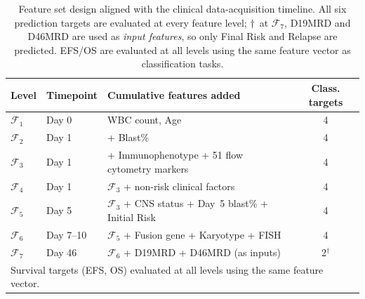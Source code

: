 \documentclass[pdflatex,sn-nature]{sn-jnl}
\begin{document}
\begin{table}[ht]
\caption{Feature set design aligned with the clinical data-acquisition
timeline. All six prediction targets are evaluated at every feature
level; $\dagger$~at $\mathcal{F}_7$, D19MRD and
D46MRD are used as \emph{input features}, so only Final Risk and
Relapse are predicted. EFS/OS are evaluated at all levels using
the same feature vector as classification tasks.}
\label{tab:expdesign}
\centering
\small
\begin{tabular}{lllc}
\toprule
\textbf{Level} & \textbf{Timepoint} & \textbf{Cumulative features added} & \textbf{Class. targets} \\
\midrule
$\mathcal{F}_1$     & Day 0     & WBC count, Age & 4 \\
$\mathcal{F}_2$     & Day 1     & + Blast\% & 4 \\
$\mathcal{F}_3$     & Day 1     & + Immunophenotype + 51 flow cytometry markers & 4 \\
$\mathcal{F}_4$     & Day 1     & $\mathcal{F}_3$ + non-risk clinical factors & 4 \\
$\mathcal{F}_5$     & Day 5     & $\mathcal{F}_3$ + CNS status + Day~5 blast\% + Initial Risk & 4 \\
$\mathcal{F}_6$     & Day 7--10 & $\mathcal{F}_5$ + Fusion gene + Karyotype + FISH & 4 \\
$\mathcal{F}_7$     & Day 46    & $\mathcal{F}_6$ + D19MRD + D46MRD (as inputs) & 2$^\dagger$ \\
\bottomrule
\multicolumn{4}{l}{Survival targets (EFS, OS) evaluated at all levels using the same feature vector.}
\end{tabular}
\end{table}
\end{document}
